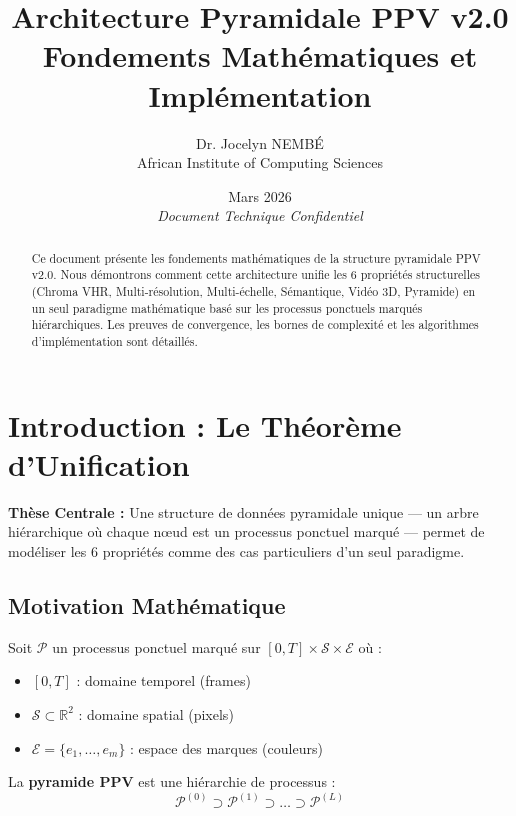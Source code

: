 \documentclass[12pt,a4paper]{article}
\title{\textbf{\color{ppvblue}Architecture Pyramidale PPV v2.0} \\ Fondements Mathématiques et Implémentation}
\author{Dr. Jocelyn NEMBÉ \\ African Institute of Computing Sciences}
\date{Mars 2026 \\ \textit{Document Technique Confidentiel}}
\theoremstyle{definition}
\begin{document}
	
	\maketitle
	
	\begin{abstract}
		\noindent Ce document présente les fondements mathématiques de la structure pyramidale PPV v2.0. Nous démontrons comment cette architecture unifie les 6 propriétés structurelles (Chroma VHR, Multi-résolution, Multi-échelle, Sémantique, Vidéo 3D, Pyramide) en un seul paradigme mathématique basé sur les processus ponctuels marqués hiérarchiques. Les preuves de convergence, les bornes de complexité et les algorithmes d'implémentation sont détaillés.
	\end{abstract}
	
	\tableofcontents
	\newpage
	
	\section{Introduction : Le Théorème d'Unification}
	
	\begin{defbox}
		\textbf{Thèse Centrale :} Une structure de données pyramidale unique — un arbre hiérarchique où chaque nœud est un processus ponctuel marqué — permet de modéliser les 6 propriétés comme des cas particuliers d'un seul paradigme.
	\end{defbox}
	
	\subsection{Motivation Mathématique}
	
	Soit $\mathcal{P}$ un processus ponctuel marqué sur $[0,T] \times \mathcal{S} \times \mathcal{E}$ où :
	\begin{itemize}
		\item $[0,T]$ : domaine temporel (frames)
		\item $\mathcal{S} \subset \mathbb{R}^2$ : domaine spatial (pixels)
		\item $\mathcal{E} = \{e_1, \dots, e_m\}$ : espace des marques (couleurs)
	\end{itemize}
	
	La \textbf{pyramide PPV} est une hiérarchie de processus :
	\begin{equation}
		\mathcal{P}^{(0)} \supset \mathcal{P}^{(1)} \supset \dots \supset \mathcal{P}^{(L)}
	\end{equation}
	
\end{document}
